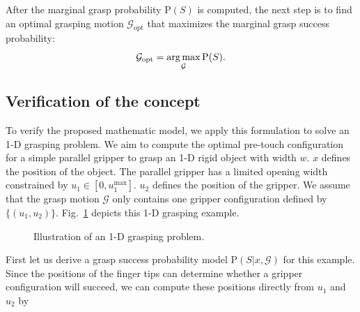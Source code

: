 After the marginal grasp probability $\text{P}(S)$ is computed, the next step is to find an optimal grasping motion $\mathcal{G}_\text{opt}$ that maximizes the marginal grasp success probability:
\begin{equation}
\mathcal{G}_\text{opt} = \operatorname*{arg\,max}_\mathcal{G} \text{P}(S).
\label{eq_g_opt}
\end{equation}

\subsection{Verification of the concept}
To verify the proposed mathematic model, we apply this formulation to solve an 1-D grasping problem. We aim to compute the optimal pre-touch configuration for a simple parallel gripper to grasp an 1-D rigid  object with width $w$. $x$ defines the position of the object. The parallel gripper has a limited opening width constrained by $u_1 \in [0, u_{1}^{\text{max}}]$. $u_2$ defines the position of the gripper. We assume that the grasp motion $\mathcal{G}$ only contains one gripper configuration defined by $\{ (u_1,u_2) \}$. Fig.~\ref{fig:1D_simple} depicts this 1-D grasping example.

\begin{figure}[!htbp]
\centering
\def\svgwidth{0.8\linewidth}

\captionsetup{justification=raggedright}
\caption{Illustration of an 1-D grasping problem.}
\label{fig:1D_simple}
\end{figure}	

First let us  derive a grasp success probability model $\text{P}(S | x,  \mathcal{G} )$ for this example. Since the positions of the finger tips can determine whether a gripper configuration will succeed, we can compute these positions directly from $u_1$ and $u_2$ by   

